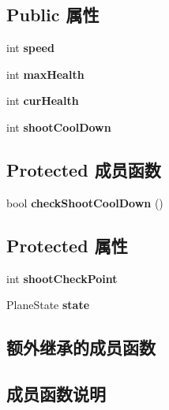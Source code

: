 \subsection*{Public 属性}
\begin{DoxyCompactItemize}
\item 
\mbox{\label{class_plane_a6ca15b26a453dfd4f81fa11a5ee278c9}} 
int {\bfseries speed}
\item 
\mbox{\label{class_plane_ac39ded6721a8137c4a8044adfbfb8a6c}} 
int {\bfseries max\+Health}
\item 
\mbox{\label{class_plane_a0434f35fe3f56acb865e51c042e43df8}} 
int {\bfseries cur\+Health}
\item 
\mbox{\label{class_plane_ae9f4ab92b0aa75cff1f14df37980eabd}} 
int {\bfseries shoot\+Cool\+Down}
\end{DoxyCompactItemize}
\subsection*{Protected 成员函数}
\begin{DoxyCompactItemize}
\item 
\mbox{\label{class_plane_a77bd3df33921e215669be6583619ee45}} 
bool {\bfseries check\+Shoot\+Cool\+Down} ()
\end{DoxyCompactItemize}
\subsection*{Protected 属性}
\begin{DoxyCompactItemize}
\item 
\mbox{\label{class_plane_a36cb09c56fbf7b8c28506d8dd70f07cb}} 
int {\bfseries shoot\+Check\+Point}
\item 
\mbox{\label{class_plane_a30babe177abbe22e61d2cc274945f3fc}} 
Plane\+State {\bfseries state}
\end{DoxyCompactItemize}
\subsection*{额外继承的成员函数}


\subsection{成员函数说明}
\mbox{\label{class_plane_a8877358878e91929c4c01bad40cbdb78}} 
